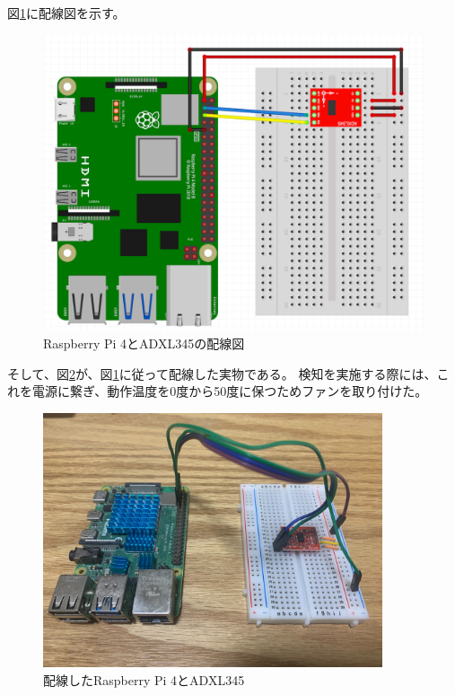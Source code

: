 図\ref{fig:meal_detector_wire_illustration}に配線図を示す。

\begin{figure}[htbp]
  \caption{Raspberry Pi 4とADXL345の配線図}
  \label{fig:meal_detector_wire_illustration}
  \begin{center}
    \includegraphics[bb=0 0 1000 800,width=15cm]{assets/raspi_adxl345.png}
  \end{center}
\end{figure}

そして、図\ref{fig:meal_detector}が、図\ref{fig:meal_detector_wire_illustration}に従って配線した実物である。
検知を実施する際には、これを電源に繋ぎ、動作温度を0度から50度に保つためファンを取り付けた。\cite{raspi_4_heat} \cite{raspi_4_spec}

\begin{figure}[htbp]
  \caption{配線したRaspberry Pi 4とADXL345}
  \label{fig:meal_detector}
  \begin{center}
    \includegraphics[bb=0 0 1300 1100,width=10cm]{assets/meal_detector.jpg}
  \end{center}
\end{figure}

